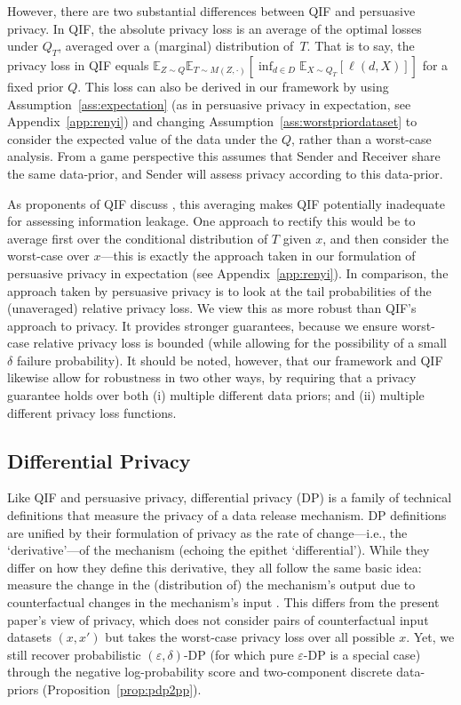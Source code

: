 \documentclass{article}
\theoremstyle{plain}
\theoremstyle{plain}
\theoremstyle{definition}
\theoremstyle{remark}
\theoremstyle{plain}
\renewcommand{\epsilon}{\varepsilon}
\begin{document}
However, there are two substantial differences between QIF and persuasive privacy.  In QIF, the absolute privacy loss is an average of the optimal losses under $Q_T$, averaged over a (marginal) distribution of~$T$.  That is to say, the privacy loss in QIF equals $\mathbb E_{Z\sim Q} \mathbb E_{T\sim M(Z,\cdot)} [ \inf_{d \in D} \mathbb E_{X \sim Q_T} [ \ell (d, X) ] ]$ for a fixed prior $Q$.
This loss can also be derived in our framework by using Assumption~\ref{ass:expectation} (as in persuasive privacy in expectation, see Appendix~\ref{app:renyi}) and changing Assumption~\ref{ass:worstpriordataset} to consider the expected value of the data under the $Q$, rather than a worst-case analysis. From a game perspective this assumes that Sender and Receiver share the same data-prior, and Sender will assess privacy according to this data-prior. 

As proponents of QIF discuss \citep{borealeWorstAveragecasePrivacy2015, borealeIntroductionQuantitativeInformation2013}, this averaging makes QIF potentially inadequate for assessing information leakage. One approach to rectify this would be to average first over the conditional distribution of $T$ given $x$, and then consider the worst-case over $x$---this is exactly the approach taken in our formulation of persuasive privacy in expectation (see Appendix~\ref{app:renyi}). In comparison, the approach taken by persuasive privacy is to look at the tail probabilities of the (unaveraged) relative privacy loss. We view this as more robust than QIF's approach to privacy. It provides stronger guarantees, because we ensure worst-case relative privacy loss is bounded (while allowing for the possibility of a small $\delta$ failure probability). It should be noted, however, that our framework and QIF likewise allow for robustness in two other ways, by requiring that a privacy guarantee holds over both (i) multiple different data priors; and (ii) multiple different privacy loss functions.


\subsection{Differential Privacy}

Like QIF and persuasive privacy, differential privacy (DP) is a family of technical definitions that measure the privacy of a data release mechanism. DP definitions are unified by their formulation of privacy as the rate of change---i.e., the `derivative'---of the mechanism (echoing the epithet `differential'). While they differ on how they define this derivative, they all follow the same basic idea: measure the change in the (distribution of) the mechanism's output due to counterfactual changes in the mechanism's input \citep{bailiePrivacyDifferentialsDifferential2026, bailieRefreshmentStirredNot2024c}. This differs from the present paper's view of privacy, which does not consider pairs of counterfactual input datasets $(x, x')$ but takes the worst-case privacy loss over all possible $x$. Yet, we still recover probabilistic $(\epsilon, \delta)$-DP (for which pure $\epsilon$-DP is a special case) through the negative log-probability score and two-component discrete data-priors (Proposition~\ref{prop:pdp2pp}). 
\end{document}
